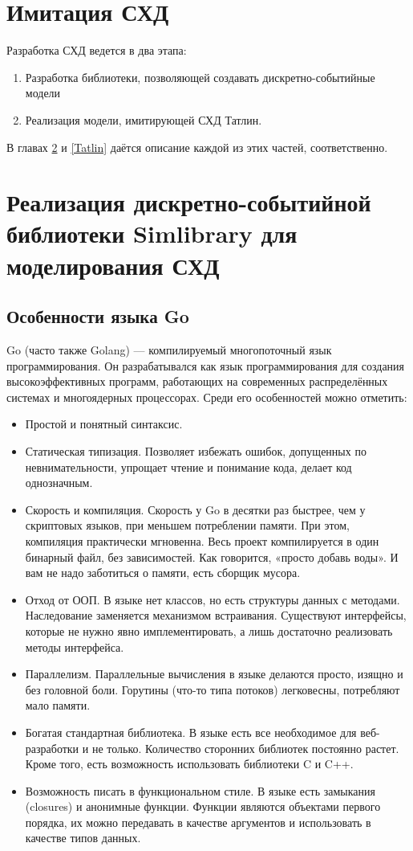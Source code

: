 \section{Имитация СХД}

Разработка СХД ведется в два этапа:
\begin{enumerate}
\item Разработка библиотеки, позволяющей создавать дискретно-событийные модели  
\item Реализация модели, имитирующей СХД Татлин.
\end{enumerate}

В главах \ref{LIB} и \ref{Tatlin} даётся описание каждой из этих частей, соответственно.

\section{Реализация дискретно-событийной библиотеки Simlibrary для моделирования СХД}\label{LIB}

\subsection{Особенности языка Go}
Go (часто также Golang) — компилируемый многопоточный язык программирования. Он разрабатывался как язык программирования для создания высокоэффективных программ, работающих на современных распределённых системах и многоядерных процессорах. Среди его особенностей можно отметить:

\begin{itemize}
\item Простой и понятный синтаксис.
\item Статическая типизация. Позволяет избежать ошибок, допущенных по невнимательности, упрощает чтение и понимание кода, делает код однозначным.
\item Скорость и компиляция. Скорость у Go в десятки раз быстрее, чем у скриптовых языков, при меньшем потреблении памяти. При этом, компиляция практически мгновенна. Весь проект компилируется в один бинарный файл, без зависимостей. Как говорится, «просто добавь воды». И вам не надо заботиться о памяти, есть сборщик мусора.
\item Отход от ООП. В языке нет классов, но есть структуры данных с методами. Наследование заменяется механизмом встраивания. Существуют интерфейсы, которые не нужно явно имплементировать, а лишь достаточно реализовать методы интерфейса.
\item Параллелизм. Параллельные вычисления в языке делаются просто, изящно и без головной боли. Горутины (что-то типа потоков) легковесны, потребляют мало памяти.
\item Богатая стандартная библиотека. В языке есть все необходимое для веб-разработки и не только. Количество сторонних библиотек постоянно растет. Кроме того, есть возможность использовать библиотеки C и C++.
\item Возможность писать в функциональном стиле. В языке есть замыкания (closures) и анонимные функции. Функции являются объектами первого порядка, их можно передавать в качестве аргументов и использовать в качестве типов данных.
\end{itemize}

